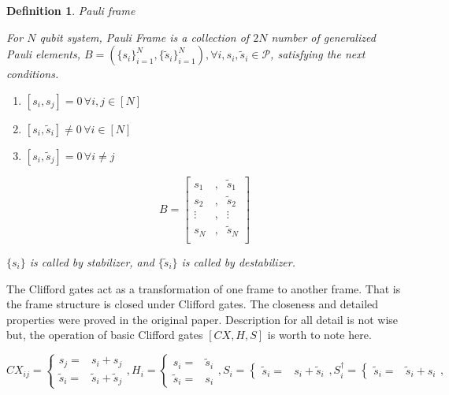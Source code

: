 \documentclass[a4paper,12pt]{article}
\newtheorem{definition}{Definition}
\begin{document}
\begin{definition}{Pauli frame}

    For $N$ qubit system, Pauli Frame is a collection of $2N$ number of 
    generalized Pauli elements, $B = (\{s_i\}_{i=1}^N, \{\tilde{s}_i\}_{i=1}^N), \forall i, s_i, \tilde{s}_i \in \mathcal{P}$,
    satisfying the next conditions.

    \begin{enumerate}
            \item $[s_i, s_j] = 0 \,\forall i, j \in [N]$
            \item $[s_i, \tilde{s}_i] \neq 0 \, \forall i \in [N]$
            \item $[s_i, \tilde{s}_j] = 0 \, \forall i\neq j$
    \end{enumerate}

    \begin{equation*}
        B = \begin{bmatrix}
            s_1 &, & \tilde{s}_1 \\
            s_2 &, & \tilde{s}_2 \\
            \vdots  &,&\vdots   \\
            s_N &, & \tilde{s}_N \\
        \end{bmatrix}
    \end{equation*}

    $\{s_i\}$ is called by \textit{stabilizer}, and $\{\tilde{s}_i\}$ is called by \textit{destabilizer}. 
\end{definition}

The Clifford gates act as a transformation of one frame to another frame.
That is the frame structure is closed under Clifford gates.
The closeness and detailed properties were proved in the original paper\cite{schmitz_graph_2023}.
Description for all detail is not wise but, the operation of basic Clifford gates $[CX, H, S]$
is worth to note here.

\begin{equation}
    CX_{ij} = \begin{cases}
        s_j =& s_i + s_j\\
        \tilde{s}_i =& \tilde{s}_i + \tilde{s}_j
    \end{cases},
    H_i =  \begin{cases}
        s_i =& \tilde{s}_i\\
        \tilde{s}_i =&s_i 
    \end{cases},
    S_i =  \begin{cases}
        \tilde{s}_i =&s_i + \tilde{s}_i  
    \end{cases},
    S^\dagger_i = \begin{cases}
        \tilde{s}_i =& \tilde{s}_i  + s_i
    \end{cases},
\end{equation}
\end{document}
